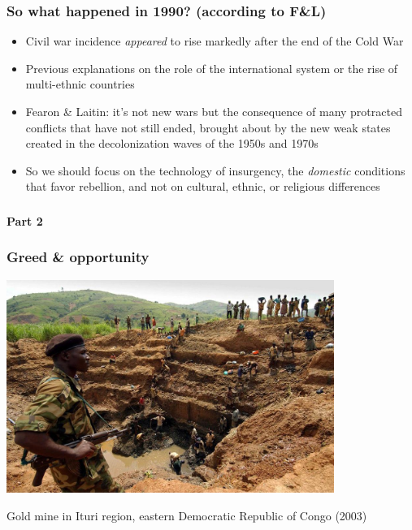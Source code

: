 \documentclass[utf8, xcolor=dvipsnames]{beamer}
\begin{document}
\begin{frame}
\frametitle{So what happened in 1990? (according to F\&L)}
\centering

\begin{itemize}[<+->]
  \item Civil war incidence \textit{appeared} to rise markedly after the end of the Cold War
  \item Previous explanations on the role of the international system or the rise of multi-ethnic countries
  \item Fearon \& Laitin: it's not new wars but the consequence of many protracted conflicts that have not still ended, brought about by the new weak states created in the decolonization waves of the 1950s and 1970s
  \item So we should focus on the technology of insurgency, the \textit{domestic} conditions that favor rebellion, and not on cultural, ethnic, or religious differences
\end{itemize}

\end{frame}

\begin{frame}
\frametitle{}
\centering

\textbf{Part 2}

\end{frame}

\begin{frame}
\frametitle{Greed \& opportunity}
\centering

\includegraphics[width = 0.8\textwidth]{img/conflict_diamonds}

\vspace{10pt}
{\small Gold mine in Ituri region, eastern Democratic Republic of Congo (2003)}

\end{frame}
\end{document}
